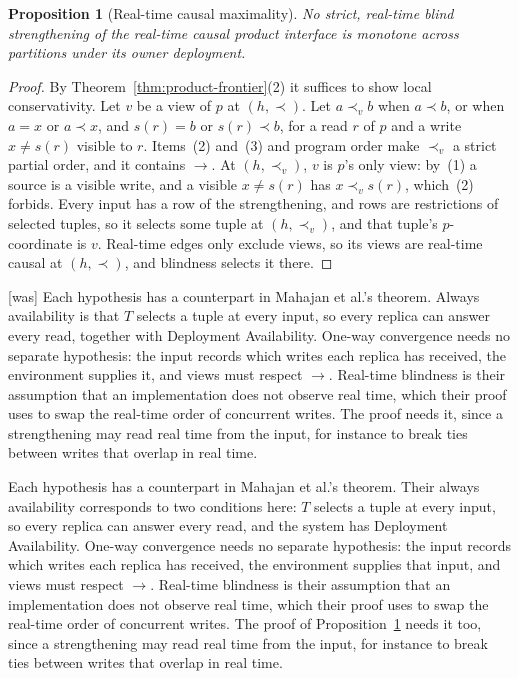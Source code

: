 \documentclass[sigconf]{cidr-2027}
\newtheorem{proposition}{Proposition}
\theoremstyle{remark}
\begin{document}
\begin{proposition}[Real-time causal maximality]
\label{prop:rtc-maximal}
No strict, real-time blind strengthening of the real-time causal product
interface is monotone across partitions under its owner deployment.
\end{proposition}

\begin{proof}
By Theorem~\ref{thm:product-frontier}(2) it suffices to show local
conservativity.  Let $v$ be a view of $p$ at $(h,\prec)$.  Let $a\prec_v b$
when $a\prec b$, or when $a=x$ or $a\prec x$, and $s(r)=b$ or $s(r)\prec b$, for a
read $r$ of $p$ and a write $x\ne s(r)$ visible to $r$.  Items~(2) and~(3) and program order
make $\prec_v$ a strict partial order, and it contains $\to$.  At $(h,\prec_v)$,
$v$ is $p$'s only view: by~(1) a source is a visible write, and a visible
$x\ne s(r)$ has $x\prec_v s(r)$, which~(2) forbids.  Every input has a row of the
strengthening, and rows are restrictions of selected tuples, so it selects
some tuple at $(h,\prec_v)$, and that tuple's $p$-coordinate is $v$.  Real-time edges
only exclude views, so its views are real-time causal at $(h,\prec)$, and
blindness selects it there.
\end{proof}



{\footnotesize\color{black!50}\noindent\textsf{[was]} Each hypothesis has a counterpart in Mahajan et al.'s theorem.  Always
availability is that $T$ selects a tuple at every input, so every replica can
answer every read, together with Deployment Availability.  One-way convergence
needs no separate hypothesis: the input records which writes each replica has
received, the environment supplies it, and views must respect $\to$.
Real-time blindness is their assumption that an implementation does not
observe real time, which their proof uses to swap the real-time order of
concurrent writes.  The proof needs it, since a strengthening may read real
time from the input, for instance to break ties between writes that overlap
in real time.\par}

\color{blue!70!black}Each hypothesis has a counterpart in Mahajan et al.'s theorem.  Their always
availability corresponds to two conditions here: $T$ selects a tuple at every
input, so every replica can answer every read, and the system has Deployment
Availability.  One-way convergence needs no separate hypothesis: the input
records which writes each replica has received, the environment supplies that
input, and views must respect $\to$.  Real-time blindness is their assumption
that an implementation does not observe real time, which their proof uses to
swap the real-time order of concurrent writes.  The proof of
Proposition~\ref{prop:rtc-maximal} needs it too, since a strengthening may read
real time from the input, for instance to break ties between writes that
overlap in real time.\color{black}
\end{document}
